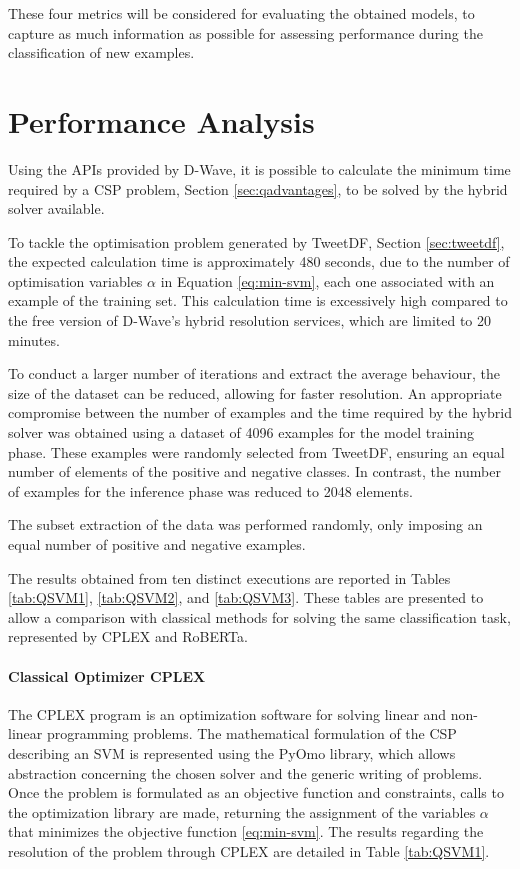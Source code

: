 These four metrics will be considered for evaluating the obtained models, to capture as much information as possible for assessing performance during the classification of new examples.

\section{Performance Analysis}\label{sec:qsvm-performance}

Using the APIs provided by D-Wave, it is possible to calculate the minimum time required by a CSP problem, Section \ref{sec:qadvantages}, to be solved by the hybrid solver available.

To tackle the optimisation problem generated by TweetDF, Section \ref{sec:tweetdf}, the expected calculation time is approximately 480 seconds, due to the number of optimisation variables $\alpha$ in Equation \ref{eq:min-svm}, each one associated with an example of the training set. 
This calculation time is excessively high compared to the free version of D-Wave's hybrid resolution services, which are limited to 20 minutes.

To conduct a larger number of iterations and extract the average behaviour, the size of the dataset can be reduced, allowing for faster resolution. 
An appropriate compromise between the number of examples and the time required by the hybrid solver was obtained using a dataset of 4096 examples for the model training phase. 
These examples were randomly selected from TweetDF, ensuring an equal number of elements of the positive and negative classes. 
In contrast, the number of examples for the inference phase was reduced to 2048 elements.

The subset extraction of the data was performed randomly, only imposing an equal number of positive and negative examples.

The results obtained from ten distinct executions are reported in Tables \ref{tab:QSVM1}, \ref{tab:QSVM2}, and \ref{tab:QSVM3}. These tables are presented to allow a comparison with classical methods for solving the same classification task, represented by CPLEX and RoBERTa.

\paragraph{Classical Optimizer CPLEX} The CPLEX program\cite{cplex} is an optimization software for solving linear and non-linear programming problems. The mathematical formulation of the CSP describing an SVM is represented using the PyOmo library, which allows abstraction concerning the chosen solver and the generic writing of problems. Once the problem is formulated as an objective function and constraints, calls to the optimization library are made, returning the assignment of the variables $\alpha$ that minimizes the objective function \ref{eq:min-svm}. The results regarding the resolution of the problem through CPLEX are detailed in Table \ref{tab:QSVM1}.

